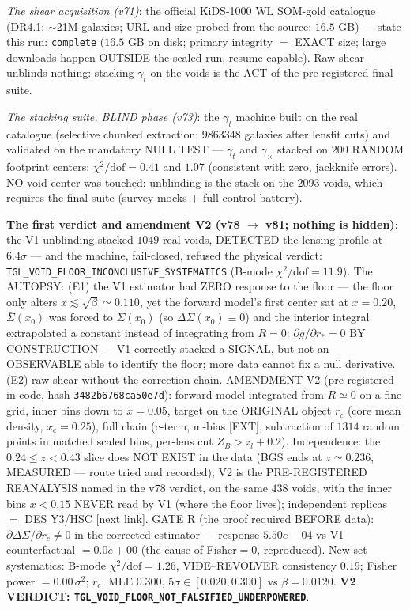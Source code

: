 \documentclass[11pt]{article}
\theoremstyle{definition}\newtheorem{deriv}{Derivation}
\begin{document}
\emph{The shear acquisition (v71)}: the official KiDS-1000 WL SOM-gold catalogue (DR4.1; $\sim$21M galaxies; URL and size probed from the source: $16.5$ GB) --- state this run: \texttt{complete} ($16.5$ GB on disk; primary integrity $=$ EXACT size; large downloads happen OUTSIDE the sealed run, resume-capable). Raw shear unblinds nothing: stacking $\gamma_t$ on the voids is the ACT of the pre-registered final suite.

\emph{The stacking suite, BLIND phase (v73)}: the $\gamma_t$ machine built on the real catalogue (selective chunked extraction; $9863348$ galaxies after lensfit cuts) and validated on the mandatory NULL TEST --- $\gamma_t$ and $\gamma_\times$ stacked on $200$ RANDOM footprint centers: $\chi^2/\mathrm{dof}=0.41$ and $1.07$ (consistent with zero, jackknife errors). NO void center was touched: unblinding is the stack on the $2093$ voids, which requires the final suite (survey mocks $+$ full control battery).

\textbf{The first verdict and amendment V2 (v78 $\to$ v81; nothing is hidden)}: the V1 unblinding stacked $1049$ real voids, DETECTED the lensing profile at $6.4\sigma$ --- and the machine, fail-closed, refused the physical verdict: \texttt{TGL\_VOID\_FLOOR\_INCONCLUSIVE\_SYSTEMATICS} (B-mode $\chi^2/\mathrm{dof}=11.9$). The AUTOPSY: (E1) the V1 estimator had ZERO response to the floor --- the floor only alters $x\lesssim\sqrt{\beta}\simeq0.110$, yet the forward model's first center sat at $x=0.20$, $\bar\Sigma(x_0)$ was forced to $\Sigma(x_0)$ (so $\Delta\Sigma(x_0)\equiv0$) and the interior integral extrapolated a constant instead of integrating from $R=0$: $\partial g/\partial r_*=0$ BY CONSTRUCTION --- V1 correctly stacked a SIGNAL, but not an OBSERVABLE able to identify the floor; more data cannot fix a null derivative. (E2) raw shear without the correction chain. AMENDMENT V2 (pre-registered in code, hash \texttt{3482b6768ca50e7d}): forward model integrated from $R\simeq0$ on a fine grid, inner bins down to $x=0.05$, target on the ORIGINAL object $r_c$ (core mean density, $x_c=0.25$), full chain (c-term, m-bias [EXT], subtraction of $1314$ random points in matched scaled bins, per-lens cut $Z_B>z_l+0.2$). Independence: the $0.24\le z<0.43$ slice does NOT EXIST in the data (BGS ends at $z\simeq0.236$, MEASURED --- route tried and recorded); V2 is the PRE-REGISTERED REANALYSIS named in the v78 verdict, on the same $438$ voids, with the inner bins $x<0.15$ NEVER read by V1 (where the floor lives); independent replicas $=$ DES Y3/HSC [next link]. GATE R (the proof required BEFORE data): $\partial\Delta\Sigma/\partial r_c\neq0$ in the corrected estimator --- response $5.50e-04$ vs V1 counterfactual $= 0.0e+00$ (the cause of Fisher$=0$, reproduced). New-set systematics: B-mode $\chi^2/\mathrm{dof}=1.26$, VIDE--REVOLVER consistency $0.19$; Fisher power $=0.00\,\sigma^2$; $r_c$: MLE $0.300$, $5\sigma\in[0.020,0.300]$ vs $\beta=0.0120$. \textbf{V2 VERDICT: \texttt{TGL\_VOID\_FLOOR\_NOT\_FALSIFIED\_UNDERPOWERED}}.
\end{document}

